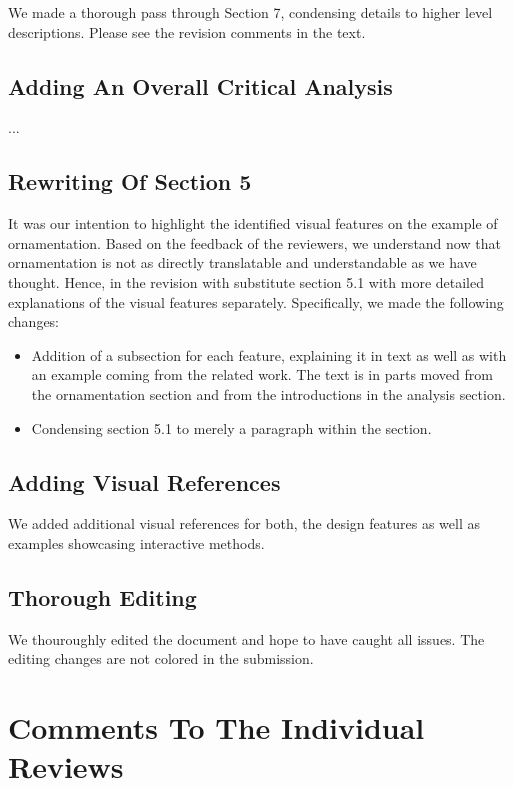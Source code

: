 \documentclass{egpubl}
\newcommand{\rev}[2]{{\color{greenrev}\textsuperscript{#1}#2}}
\renewcommand{\rev}[2]{{#2}}
\begin{document}
\rev{}{We made a thorough pass through Section 7, condensing details to higher level descriptions. Please see the revision comments in the text.}

\subsection*{Adding An Overall Critical Analysis}

...

\subsection*{Rewriting Of Section 5}

\rev{}{It was our intention to highlight the identified visual features on the example of ornamentation. Based on the feedback of the reviewers, we understand now that ornamentation is not as directly translatable and understandable as we have thought. Hence, in the revision with substitute section 5.1 with more detailed explanations of the visual features separately. Specifically, we made the following changes:
\begin{itemize}
    \item Addition of a subsection for each feature, explaining it in text as well as with an example coming from the related work. The text is in parts moved from the ornamentation section and from the introductions in the analysis section.
    \item Condensing section 5.1 to merely a paragraph within the section.
\end{itemize}
}

\subsection*{Adding Visual References}

\rev{}{We added additional visual references for both, the design features as well as examples showcasing interactive methods.}

\subsection*{Thorough Editing}

\rev{}{We thouroughly edited the document and hope to have caught all issues. The editing changes are not colored in the submission.}


\section*{Comments To The Individual Reviews}
\end{document}
